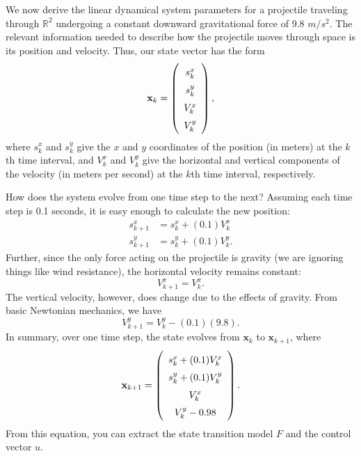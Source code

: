 We now derive the linear dynamical system parameters for a projectile traveling through $\mathbb{R}^2$ undergoing a constant downward gravitational force of 9.8 $m/s^2$.
The relevant information needed to describe how the projectile moves through space is its position and velocity.
Thus, our state vector has the form
\begin{equation*}
    \def\arraystretch{1.5}
    \mathbf{x}_k = \left( \begin{array}{c} s_k^{x} \\ s_k^{y} \\ V_k^{x} \\ V_k^{y} \end{array} \right),
\end{equation*}
where $s_k^x$ and $s_k^y$ give the $x$ and $y$ coordinates of the position (in meters) at the $k$th time interval, and $V_k^x$ and $V_k^y$ give the horizontal and vertical components of the velocity (in meters per second) at the $k$th time interval, respectively.

How does the system evolve from one time step to the next?
Assuming each time step is 0.1 seconds, it is easy enough to calculate the new position:
\begin{align*}
    s_{k+1}^x &= s_k^x + (0.1)V_k^x \\
    s_{k+1}^y &= s_k^y + (0.1)V_k^y.
\end{align*}
Further, since the only force acting on the projectile is gravity (we are ignoring things like wind resistance), the horizontal velocity remains constant:
\begin{equation*}
    V_{k+1}^x = V_k^x.
\end{equation*}
The vertical velocity, however, does change due to the effects of gravity.
From basic Newtonian mechanics, we have
\begin{equation*}
    V_{k+1}^y = V_k^y - (0.1)(9.8).
\end{equation*}
In summary, over one time step, the state evolves from $\mathbf{x}_k$ to $\mathbf{x}_{k+1}$, where
\begin{equation*}
    \def\arraystretch{1.5}
    \mathbf{x}_{k+1} = \left( \begin{array}{c} s_k^x + (0.1)V_k^x \\ s_k^y + (0.1)V_k^y \\ V_k^x \\ V_k^y - 0.98 \end{array} \right).
\end{equation*}
From this equation, you can extract the state transition model $F$ and the control vector $u$.

